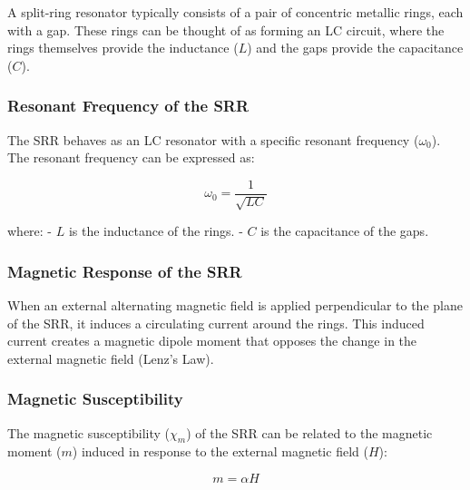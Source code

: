 \documentclass[
  a4paper,
]{book}
\begin{document}
\begin{tcolorbox}[enhanced jigsaw, coltitle=black, title=\textcolor{quarto-callout-note-color}{\faInfo}\hspace{0.5em}{Split-Ring Resonators (SRRs)}, colframe=quarto-callout-note-color-frame, toprule=.15mm, opacitybacktitle=0.6, left=2mm, opacityback=0, breakable, toptitle=1mm, bottomtitle=1mm, leftrule=.75mm, arc=.35mm, titlerule=0mm, colbacktitle=quarto-callout-note-color!10!white, rightrule=.15mm, bottomrule=.15mm, colback=white]

A split-ring resonator typically consists of a pair of concentric
metallic rings, each with a gap. These rings can be thought of as
forming an LC circuit, where the rings themselves provide the inductance
(\(L\)) and the gaps provide the capacitance (\(C\)).

\subsubsection{Resonant Frequency of the
SRR}\label{resonant-frequency-of-the-srr}

The SRR behaves as an LC resonator with a specific resonant frequency
(\(\omega_0\)). The resonant frequency can be expressed as:

\[ \omega_0 = \frac{1}{\sqrt{LC}} \]

where: - \(L\) is the inductance of the rings. - \(C\) is the
capacitance of the gaps.

\subsubsection{Magnetic Response of the
SRR}\label{magnetic-response-of-the-srr}

When an external alternating magnetic field is applied perpendicular to
the plane of the SRR, it induces a circulating current around the rings.
This induced current creates a magnetic dipole moment that opposes the
change in the external magnetic field (Lenz's Law).

\subsubsection{Magnetic Susceptibility}\label{magnetic-susceptibility}

The magnetic susceptibility (\(\chi_m\)) of the SRR can be related to
the magnetic moment (\(m\)) induced in response to the external magnetic
field (\(H\)):

\[ m = \alpha H \]


\end{tcolorbox}
\end{document}
